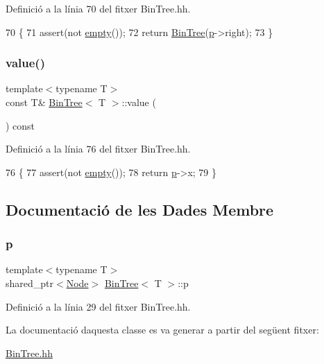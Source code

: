 Definició a la línia 70 del fitxer Bin\+Tree.\+hh.


\begin{DoxyCode}
70                            \{
71         assert(not \hyperlink{class_bin_tree_a74cda259ba5c25b8ee38ed4dc33e4fad}{empty}());
72         \textcolor{keywordflow}{return} \hyperlink{class_bin_tree_a47eef22d29cd023449d97c073c08e5b6}{BinTree}(\hyperlink{class_bin_tree_afe3647af1dda90f6ddf1deee6560fcf1}{p}->right);
73     \}
\end{DoxyCode}
\mbox{\label{class_bin_tree_a734e785b089c87b49187ee7c58edf5f3}} 
\subsubsection{\texorpdfstring{value()}{value()}}
{\footnotesize\ttfamily template$<$typename T$>$ \\
const T\& \hyperlink{class_bin_tree}{Bin\+Tree}$<$ T $>$\+::value (\begin{DoxyParamCaption}{ }\end{DoxyParamCaption}) const}



Definició a la línia 76 del fitxer Bin\+Tree.\+hh.


\begin{DoxyCode}
76                             \{
77         assert(not \hyperlink{class_bin_tree_a74cda259ba5c25b8ee38ed4dc33e4fad}{empty}());
78         \textcolor{keywordflow}{return} \hyperlink{class_bin_tree_afe3647af1dda90f6ddf1deee6560fcf1}{p}->x;
79     \}
\end{DoxyCode}


\subsection{Documentació de les Dades Membre}
\mbox{\label{class_bin_tree_afe3647af1dda90f6ddf1deee6560fcf1}} 
\subsubsection{\texorpdfstring{p}{p}}
{\footnotesize\ttfamily template$<$typename T$>$ \\
shared\+\_\+ptr$<$\hyperlink{struct_bin_tree_1_1_node}{Node}$>$ \hyperlink{class_bin_tree}{Bin\+Tree}$<$ T $>$\+::p\hspace{0.3cm}{\ttfamily [private]}}



Definició a la línia 29 del fitxer Bin\+Tree.\+hh.



La documentació d\textquotesingle{}aquesta classe es va generar a partir del següent fitxer\+:\begin{DoxyCompactItemize}
\item 
\hyperlink{_bin_tree_8hh}{Bin\+Tree.\+hh}\end{DoxyCompactItemize}

